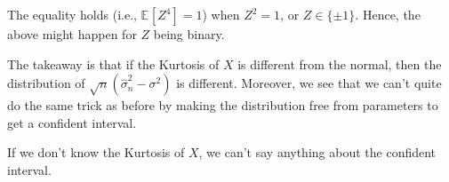 \begin{eg}
	The equality holds (i.e., \(\mathbb{E}_{}[Z^4] = 1\)) when \(Z^2 = 1\), or \(Z \in \{ \pm 1 \} \). Hence, the above might happen for \(Z\) being binary.
\end{eg}

The takeaway is that if the Kurtosis of \(X\) is different from the normal, then the distribution of \(\sqrt{n} (\hat{\sigma} _n^2 - \sigma ^2)\) is different. Moreover, we see that we can't quite do the same trick as before by making the distribution free from parameters to get a confident interval.

\begin{note}
	If we don't know the Kurtosis of \(X\), we can't say anything about the confident interval.
\end{note}